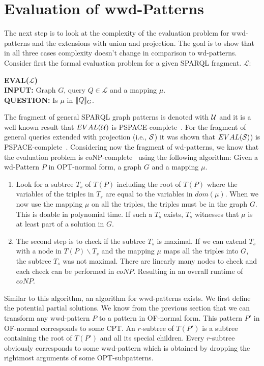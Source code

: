 \section{Evaluation of wwd-Patterns}
The next step is to look at the complexity of the evaluation problem for
wwd-patterns and the extensions with union and projection. The goal is to show
that in all three cases complexity doesn't change in comparison to wd-patterns.
Consider first the formal evaluation problem for a given SPARQL fragment.
$\mathcal{L}$:
\begin{framed}\noindent \textbf{EVAL($\mathcal{L}$)}\\
	\textbf{INPUT:} Graph $G$, query $Q \in  \mathcal{L}$ and a mapping $\mu$.\\
	\textbf{QUESTION:} Is $\mu$ in $\llbracket Q \rrbracket_G$.
\end{framed}
The fragment of general SPARQL graph patterns is denoted with $\mathcal{U}$ and it is a
well known result that $EVAL(\mathcal{U})$ is PSPACE-complete~\cite{perez2009semantics}.
For the fragment of general queries extended with projection (i.e., $\mathcal{S}$)
it was shown that $EVAL(\mathcal{S})$) is PSPACE-complete~\cite{letelier2013static}.
Considering now the fragment of wd-patterns, we know that the evaluation problem
is coNP-complete~\cite{letelier2013static} using the following algorithm:
Given a wd-Pattern $P$ in OPT-normal form, a graph $G$ and a mapping $\mu$.
\begin{enumerate}
	\item Look for a subtree $T_s$ of $T(P)$ including the root of $T(P)$ where the
		variables of the triples in $T_s$ are equal to the variables in $dom(\mu)$. 
		When we now use the mapping $\mu$ on all the triples, the triples must
		be in the graph $G$. This is doable in polynomial time. If such a $T_s$
		exists, $T_s$ witnesses	that $\mu$ is at least part of a solution in
		$G$.
	\item The second step is to check if the subtree $T_s$ is maximal. If we can
		extend $T_s$ with a node in $T(P)\backslash T_s$ and the mapping $\mu$ maps
		all the triples into $G$, the subtree $T_s$ was not maximal. There are
		linearly many nodes to check and each check can be performed in $coNP$.
		Resulting in an overall runtime of $coNP$.
\end{enumerate}
Similar to this algorithm, an algorithm for wwd-patterns exists. 
We first define the potential partial solutions. 
We know from the previous section that we can transform any wwd-pattern $P$ to a
pattern in OF-normal form. This pattern $P'$ in OF-normal corresponds to some
CPT. An $r$-subtree of $T(P')$ is a subtree containing the root of $T(P')$ and
all its special children. Every $r$-subtree obviously corresponds to some
wwd-pattern which is obtained by dropping the rightmost arguments of some
OPT-subpatterns.

